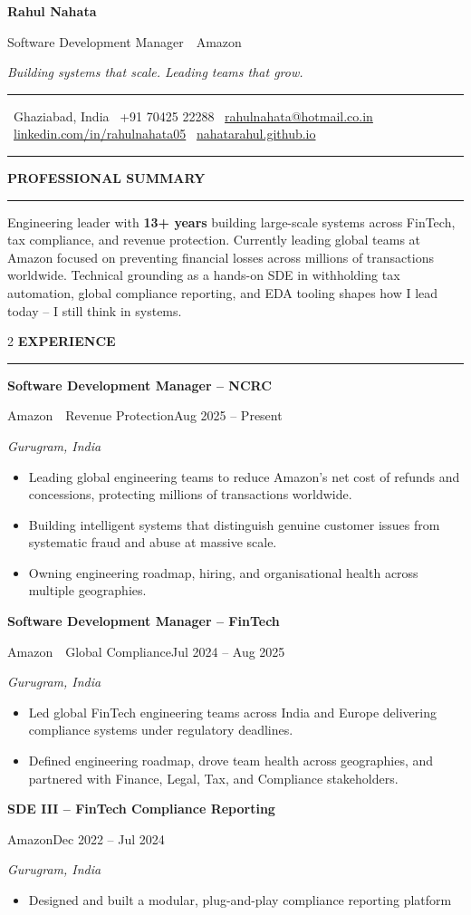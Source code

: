 \documentclass[10pt,a4paper]{article}
\makeatletter
\newcommand{\cvsection}[1]{%
  \vspace{8pt}%
  {\normalsize\bfseries\color{textdark}\MakeUppercase{#1}}\par
  \vspace{1pt}%
  {\color{accent}\rule{\linewidth}{1pt}}\par
  \vspace{3pt}%
}
\newcommand{\role}[4]{%
  {\bfseries\color{textdark}#1}\par
  {\color{accent}\small #2}\hfill{\color{textmuted}\small #4}\par
  {\color{textlight}\small\itshape #3}\par\vspace{2pt}
}
\newcommand{\resumeheader}{%
  \begingroup
  \setlength{\parskip}{0pt}
  \begin{flushleft}
    {\fontsize{26pt}{30pt}\selectfont\bfseries\color{textdark}Rahul Nahata}\par
    \vspace{2pt}
    {\large\color{accent}Software Development Manager~\textperiodcentered~Amazon}\par
    \vspace{2pt}
    {\small\color{textmuted}\itshape Building systems that scale. Leading teams that grow.}\par
    \vspace{6pt}
    {\color{border}\rule{\linewidth}{0.8pt}}\par
    \vspace{3pt}
    {\small\color{textmuted}%
      \faMapMarker*~Ghaziabad, India \quad
      \faPhone*~+91 70425 22288 \quad
      \faEnvelope~\href{mailto:rahulnahata@hotmail.co.in}{rahulnahata@hotmail.co.in} \quad
      \faLinkedin~\href{https://linkedin.com/in/rahulnahata05}{linkedin.com/in/rahulnahata05} \quad
      \faGlobe~\href{https://nahatarahul.github.io}{nahatarahul.github.io}%
    }\par
    \vspace{2pt}
    {\color{border}\rule{\linewidth}{0.4pt}}
  \end{flushleft}
  \endgroup
  \vspace{2pt}
}
\makeatother
\begin{document}
\pagestyle{empty}
\setlength{\parindent}{0pt}
\resumeheader
\cvsection{Professional Summary}
\small
Engineering leader with \textbf{13+ years} building large-scale systems across FinTech, tax
compliance, and revenue protection. Currently leading global teams at Amazon focused on
preventing financial losses across millions of transactions worldwide. Technical grounding
as a hands-on SDE in withholding tax automation, global compliance reporting, and EDA
tooling shapes how I lead today -- I still think in systems.
\vspace{2pt}
\setlength{\columnsep}{1.2em}
\setlength{\columnseprule}{0pt}
\begin{paracol}{2}
\cvsection{Experience}
\role{Software Development Manager -- NCRC}{Amazon~\textperiodcentered~Revenue Protection}{Gurugram, India}{Aug 2025 -- Present}
\begin{itemize}
  \item Leading global engineering teams to reduce Amazon's net cost of refunds and
        concessions, protecting millions of transactions worldwide.
  \item Building intelligent systems that distinguish genuine customer issues from
        systematic fraud and abuse at massive scale.
  \item Owning engineering roadmap, hiring, and organisational health across
        multiple geographies.
\end{itemize}
\role{Software Development Manager -- FinTech}{Amazon~\textperiodcentered~Global Compliance}{Gurugram, India}{Jul 2024 -- Aug 2025}
\begin{itemize}
  \item Led global FinTech engineering teams across India and Europe delivering
        compliance systems under regulatory deadlines.
  \item Defined engineering roadmap, drove team health across geographies, and
        partnered with Finance, Legal, Tax, and Compliance stakeholders.
\end{itemize}
\role{SDE III -- FinTech Compliance Reporting}{Amazon}{Gurugram, India}{Dec 2022 -- Jul 2024}
\begin{itemize}
  \item Designed and built a modular, plug-and-play compliance reporting platform

\end{itemize}
\end{paracol}
\end{document}

